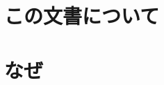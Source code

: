 \documentclass[a4paper]{article}
\author{Hiroaki Yamamoto}
\title{}
\begin{document}
  \nocite{*}
  \cfoot{\thepage}
  \section{この文書について}
    \lipsum
  \section{なぜ}
    \lipsum

  
  
\end{document}
